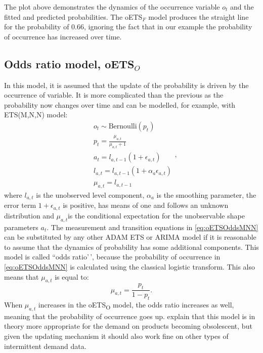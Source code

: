 \documentclass[
]{book}
\theoremstyle{definition}
\theoremstyle{definition}
\theoremstyle{definition}
\theoremstyle{definition}
\theoremstyle{remark}
\begin{document}
The plot above demonstrates the dynamics of the occurrence variable \(o_t\) and the fitted and predicted probabilities. The oETS\(_F\) model produces the straight line for the probability of 0.66, ignoring the fact that in our example the probability of occurrence has increased over time.

\hypertarget{oETSO}{%
\subsection{\texorpdfstring{Odds ratio model, oETS\(_O\)}{Odds ratio model, oETS\_O}}\label{oETSO}}

In this model, it is assumed that the update of the probability is driven by the occurrence of variable. It is more complicated than the previous as the probability now changes over time and can be modelled, for example, with ETS(M,N,N) model:
\begin{equation}
    \begin{aligned}
        & o_t \sim \text{Bernoulli} \left(p_t \right) \\
        & p_t = \frac{\mu_{a,t}}{\mu_{a,t}+1} \\
        & a_t = l_{a,t-1} \left(1 + \epsilon_{a,t} \right) \\
        & l_{a,t} = l_{a,t-1}( 1  + \alpha_{a} \epsilon_{a,t}) \\
        & \mu_{a,t} = l_{a,t-1}
    \end{aligned},
    \label{eq:oETSOddsMNN}
\end{equation}
where \(l_{a,t}\) is the unobserved level component, \(\alpha_{a}\) is the smoothing parameter, the error term \(1+\epsilon_{a,t}\) is positive, has means of one and follows an unknown distribution and \(\mu_{a,t}\)is the conditional expectation for the unobservable shape parameters \(a_t\). The measurement and transition equations in \eqref{eq:oETSOddsMNN} can be substituted by any other ADAM ETS or ARIMA model if it is reasonable to assume that the dynamics of probability has some additional components. This model is called ``odds ratio'\,', because the probability of occurrence in \eqref{eq:oETSOddsMNN} is calculated using the classical logistic transform. This also means that \(\mu_{a,t}\) is equal to:
\begin{equation} \label{eq:oETS_O_oddsRatio}
    \mu_{a,t} = \frac{p_t}{1 - p_t} .
\end{equation}
When \(\mu_{a,t}\) increases in the oETS\textsubscript{O} model, the odds ratio increases as well, meaning that the probability of occurrence goes up. \citet{Svetunkov2019a} explain that this model is in theory more appropriate for the demand on products becoming obsolescent, but given the updating mechanism it should also work fine on other types of intermittent demand data.
\end{document}

